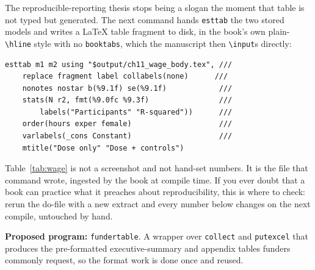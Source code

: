 \documentclass[
    a4paper,
    fontsize=10pt,
    twoside=true,
    numbers=noenddot,
]{kaobook}
\begin{document}
The reproducible-reporting thesis stops being a slogan the moment that table is not typed but generated. The next command hands \texttt{esttab} the two stored models and writes a \LaTeX{} table fragment to disk, in the book's own plain-\texttt{\textbackslash hline} style with no \texttt{booktabs}, which the manuscript then \texttt{\textbackslash input}s directly:
{\footnotesize
\begin{verbatim}
esttab m1 m2 using "$output/ch11_wage_body.tex", ///
    replace fragment label collabels(none)      ///
    nonotes nostar b(%9.1f) se(%9.1f)            ///
    stats(N r2, fmt(%9.0fc %9.3f)                ///
        labels("Participants" "R-squared"))      ///
    order(hours exper female)                    ///
    varlabels(_cons Constant)                    ///
    mtitle("Dose only" "Dose + controls")
\end{verbatim}
}
Table~\ref{tab:wage} is not a screenshot and not hand-set numbers. It is the file that command wrote, ingested by the book at compile time. If you ever doubt that a book can practice what it preaches about reproducibility, this is where to check: rerun the do-file with a new extract and every number below changes on the next compile, untouched by hand.

\begin{table}[htbp]
\centering
\caption[Reproducible earnings table, ingested from a do-file]{Program earnings model for a simulated workforce cohort (seed \texttt{20260704}). OLS coefficients with standard errors in parentheses; earnings are dollars per quarter. \textbf{This table is not typed:} \texttt{ch11\_tables.do} estimated the two models and wrote this exact \texttt{tabular} with \texttt{esttab}; the book ingests it with \texttt{\textbackslash input\{ch11\_wage\_table.tex\}}. Rerun the do-file and the numbers here update on the next compile.}
\label{tab:wage}

\end{table}

\begin{kaobox}[frametitle=Ado-file Idea: \texttt{fundertable}]
\textbf{Proposed program:} \texttt{fundertable}. A wrapper over \texttt{collect} and \texttt{putexcel} that produces the pre-formatted executive-summary and appendix tables funders commonly request, so the format work is done once and reused.
\end{kaobox}
\end{document}
